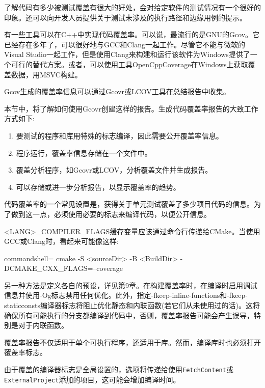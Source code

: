 
了解代码有多少被测试覆盖有很大的好处，会对给定软件的测试情况有一个很好的印象。还可以向开发人员提供关于测试未涉及的执行路径和边缘用例的提示。

有一些工具可以在C++中实现代码覆盖率。可以说，最流行的是GNU的Gcov。它已经存在多年了，可以很好地与GCC和Clang一起工作。尽管它不能与微软的Visual Studio一起工作，但是使用Clang来构建和运行该软件为Windows提供了一个可行的替代方案。或者，可以使用工具OpenCppCoverage在Windows上获取覆盖数据，用MSVC构建。

Gcov生成的覆盖率信息可以通过Gcovr或LCOV工具在总结报告中收集。


本节中，将了解如何使用Gcovr创建这样的报告。生成代码覆盖率报告的大致工作方式如下:

\begin{enumerate}
\item 
要测试的程序和库用特殊的标志编译，因此需要公开覆盖率信息。

\item 
程序运行，覆盖率信息存储在一个文件中。

\item 
覆盖分析程序，如Gcovr或LCOV，分析覆盖文件并生成报告。

\item 
可以存储或进一步分析报告，以显示覆盖率的趋势。
\end{enumerate}

代码覆盖率的一个常见设置是，获得关于单元测试覆盖了多少项目代码的信息。为了做到这一点，必须使用必要的标志来编译代码，以便公开信息。

<LANG>\_COMPILER\_FLAGS缓存变量应该通过命令行传递给CMake。当使用GCC或Clang时，看起来可能像这样:

\begin{tcblisting}{commandshell={}}
cmake -S <sourceDir> -B <BuildDir> -DCMAKE_CXX_FLAGS=--coverage
\end{tcblisting}

另一种方法是定义各自的预设，详见第9章。在构建覆盖率时，在编译时启用调试信息并使用-Og标志禁用任何优化。此外，指定-fkeep-inline-functions和-fkeep-staticconsts编译器标志将阻止优化静态和内联函数(若它们从未使用过的话)。这将确保所有可能执行的分支都编译到代码中，否则，覆盖率报告可能会产生误导，特别是对于内联函数。

覆盖率报告不仅适用于单个可执行程序，还适用于库。然而，编译库时也必须打开覆盖率标志。

由于覆盖的编译器标志是全局设置的，选项将传递给使用\texttt{FetchContent}或\texttt{ExternalProject}添加的项目，这可能会增加编译时间。


